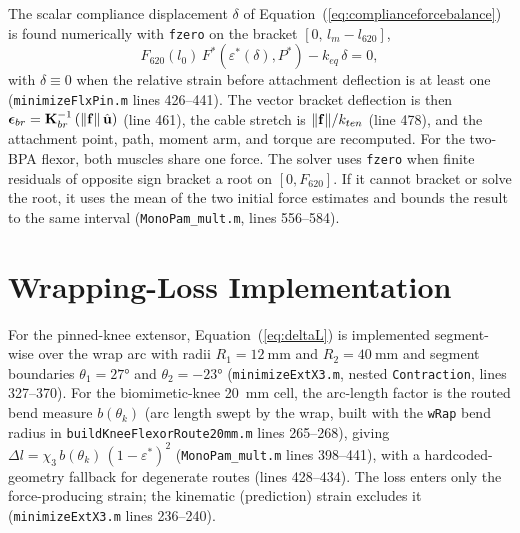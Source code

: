 The scalar compliance displacement $\delta$ of Equation~(\ref{eq:complianceforcebalance}) is found numerically with \texttt{fzero} on the bracket $[0,\, l_{m}-l_{620}]$,
\begin{equation}
    F_{620}(l_{0})\,F^{*}\!\left(\varepsilon^{*}(\delta),P^{*}\right) - k_{eq}\,\delta = 0,
    \label{eq:app_forcebalance}
\end{equation}
with $\delta \equiv 0$ when the relative strain before attachment deflection is at least one (\texttt{minimizeFlxPin.m} lines 426--441). The vector bracket deflection is then $\boldsymbol{\epsilon}_{br} = \mathbf{K}_{br}^{-1}\left(\lVert\mathbf{f}\rVert\,\hat{\mathbf{u}}\right)$ (line 461), the cable stretch is $\lVert\mathbf{f}\rVert/k_{ten}$ (line 478), and the attachment point, path, moment arm, and torque are recomputed. For the two-BPA flexor, both muscles share one force. The solver uses \texttt{fzero} when finite residuals of opposite sign bracket a root on $[0,F_{620}]$. If it cannot bracket or solve the root, it uses the mean of the two initial force estimates and bounds the result to the same interval (\nolinkurl{MonoPam_mult.m}, lines 556--584).

\section{Wrapping-Loss Implementation}

For the pinned-knee extensor, Equation~(\ref{eq:deltaL}) is implemented segment-wise over the wrap arc with radii $R_1 = \qty{12}{\mm}$ and $R_2 = \qty{40}{\mm}$ and segment boundaries $\theta_{1} = \ang{27}$ and $\theta_{2} = \ang{-23}$ (\texttt{minimizeExtX3.m}, nested \texttt{Contraction}, lines 327--370). For the biomimetic-knee \qty{20}{\mm} cell, the arc-length factor is the routed bend measure $b(\theta_{k})$ (arc length swept by the wrap, built with the \texttt{wRap} bend radius in \texttt{buildKneeFlexorRoute20mm.m} lines 265--268), giving $\Delta l = \chi_{3}\, b(\theta_{k})\,(1-\varepsilon^{*})^{2}$ (\nolinkurl{MonoPam_mult.m} lines 398--441), with a hardcoded-geometry fallback for degenerate routes (lines 428--434). The loss enters only the force-producing strain; the kinematic (prediction) strain excludes it (\texttt{minimizeExtX3.m} lines 236--240).

